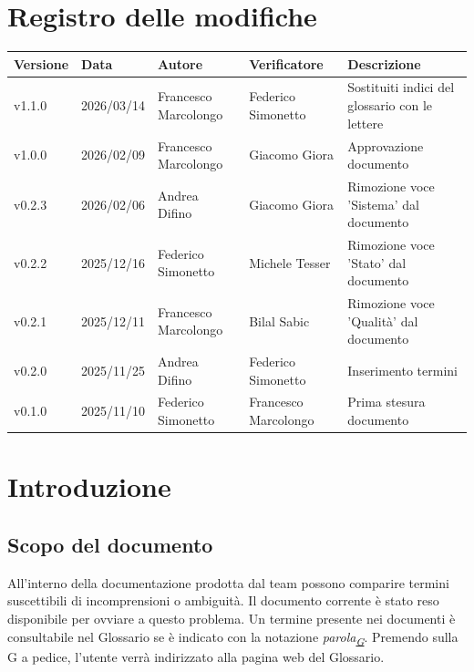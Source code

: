 \documentclass[a4paper,12pt]{article}
\newcommand{\DataUltimaModifica}{2026/03/14}
\newcommand{\VersioneDocumento}{v1.1.0} %
\begin{document}
\section*{Registro delle modifiche}
    \begin{center}
        \begin{tabularx}{\textwidth}{|l|l|l|l|X|}
            \hline
            \textbf{Versione} & \textbf{Data} & \textbf{Autore} & \textbf{Verificatore} & \textbf{Descrizione} \\
            \hline
            \VersioneDocumento & \DataUltimaModifica & Francesco Marcolongo & Federico Simonetto & Sostituiti indici del glossario con le lettere\\
            \hline
            v1.0.0 & 2026/02/09 & Francesco Marcolongo & Giacomo Giora & Approvazione documento\\
            \hline
            v0.2.3 & 2026/02/06 & Andrea Difino & Giacomo Giora & Rimozione voce 'Sistema' dal documento\\
            \hline
            v0.2.2 & 2025/12/16 & Federico Simonetto & Michele Tesser & Rimozione voce 'Stato' dal documento\\
            \hline
            v0.2.1 & 2025/12/11 & Francesco Marcolongo & Bilal Sabic & Rimozione voce 'Qualità' dal documento\\
            \hline
            v0.2.0 & 2025/11/25 & Andrea Difino & Federico Simonetto & Inserimento termini\\
            \hline
            v0.1.0 & 2025/11/10 & Federico Simonetto & Francesco Marcolongo & Prima stesura documento\\
            \hline
        \end{tabularx}
    \end{center}


\newpage

\tableofcontents


\newpage
\section{Introduzione}
    
    \subsection{Scopo del documento}
        All'interno della documentazione prodotta dal team possono comparire termini suscettibili di incomprensioni o ambiguità. Il documento corrente è stato reso disponibile per ovviare a questo problema. Un termine presente nei documenti è consultabile nel Glossario se è indicato con la notazione \textit{parola\textsubscript{\href{https://atlasteam9.github.io/Atlas/glossario.html}{G}}}.
        Premendo sulla G a pedice, l'utente verrà indirizzato alla pagina web del Glossario.
    
\end{document}
